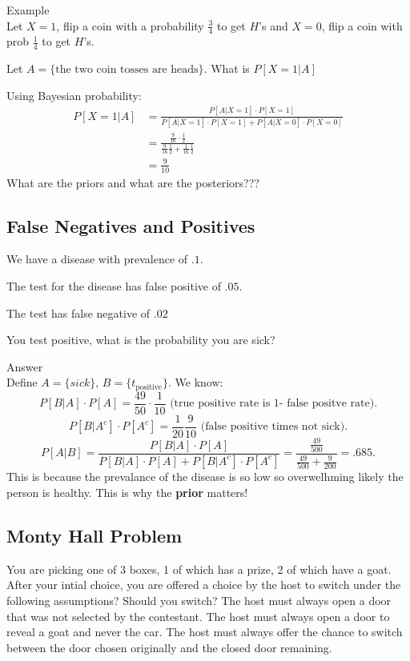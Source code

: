 \documentclass[a4paper]{article}
\begin{document}
\begin{note}{Example} \\
  Let $X=1$, flip a coin with a probability  $\frac{3}{4} $ to get $H$'s and  $X=0$, flip a coin 
  with prob  $\frac{1}{4}$ to get $H$'s.

  Let  $A = \{ \text{the two coin tosses are heads}\} $. What is $P[X=1| A]$

  Using Bayesian probability:
  \begin{align*}
    P[X=1|A] &= \frac{P[A | X=1] \cdot P[X=1]}{P[A|X=1] \cdot P[X=1] + P[A|X=0] \cdot P[X=0]} \\
             &= \frac{\frac{9}{16} \cdot \frac{1}{2}}{\frac{9}{16} \frac{1}{2} + \frac{1}{16} \frac{1}{2}} \\
             &= \frac{9}{10}
  \end{align*}
  What are the priors and what are the posteriors???
\end{note}

\subsection{False Negatives and Positives}
We have a disease with prevalence of $.1$. 

The test for the disease has false positive of  $.05$.

The test has false negative of  $.02$

You test positive, what is the probability you are sick?

\begin{note}{Answer} \\
  Define $A = \{sick\}$, $B = \{t_{\text{positive}}\}$. We know: 
  \[
    P[B | A] \cdot P[A] = \frac{49}{50} \cdot \frac{1}{10} \text{ (true positive rate is  1- false positve rate)}
  .\] 
  \[
    P[B|A^c] \cdot P[A^c] = \frac{1}{20}\frac{9}{10} \text{  (false positive times not sick)} 
  .\]
  \[
    P[A|B] = \frac{P[B|A] \cdot P[A]}{P[B|A] \cdot P[A] + P[B|A^c] \cdot P[A^c]} = \frac{\frac{49}{500}}{\frac{49}{500} + \frac{9}{200}}
    = .685
  .\] 
  This is because the prevalance of the disease is so low so overwelhming likely the person is healthy. This
  is why the \textbf{prior} matters!
\end{note}

\subsection{Monty Hall Problem}
You are picking one of 3 boxes, 1 of which has a prize, 2 of which have a goat. After your 
intial choice, you are offered a choice by the host to switch under the following assumptions? Should you switch?
The host must always open a door that was not selected by the contestant.
The host must always open a door to reveal a goat and never the car.
The host must always offer the chance to switch between the door chosen originally and the closed door remaining.
\end{document}
